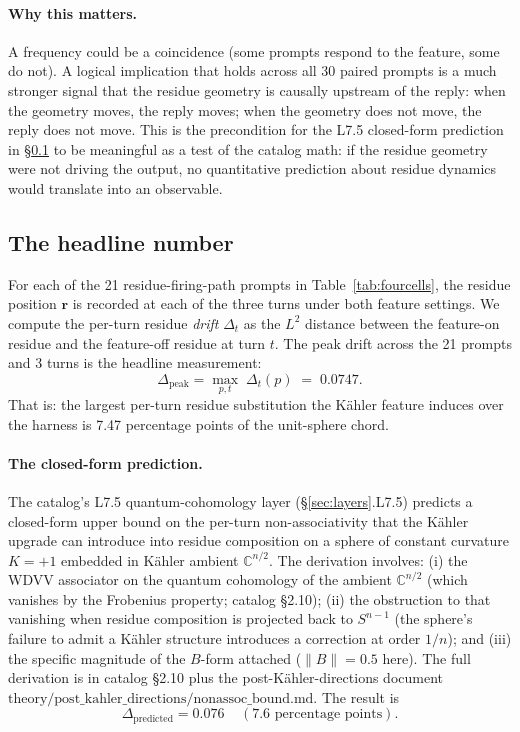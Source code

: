 \documentclass[11pt,letterpaper]{article}
\begin{document}
\paragraph{Why this matters.}
A frequency could be a coincidence (some prompts respond to the
feature, some do not). A logical implication that holds across all
30 paired prompts is a much stronger signal that the residue
geometry is causally upstream of the reply: when the geometry
moves, the reply moves; when the geometry does not move, the reply
does not move. This is the precondition for the L7.5 closed-form
prediction in \S\ref{sec:headlinenum} to be meaningful as a test of
the catalog math: if the residue geometry were not driving the
output, no quantitative prediction about residue dynamics would
translate into an observable.

\subsection{The headline number}
\label{sec:headlinenum}

For each of the 21 residue-firing-path prompts in
Table~\ref{tab:fourcells}, the residue position $\mathbf{r}$ is
recorded at each of the three turns under both feature settings.
We compute the per-turn residue \emph{drift} $\Delta_t$ as the
$L^2$ distance between the feature-on residue and the feature-off
residue at turn $t$. The peak drift across the 21 prompts and 3
turns is the headline measurement:
\[
\Delta_{\text{peak}} = \max_{p, t} \; \Delta_t(p) \; = \; 0.0747.
\]
That is: the largest per-turn residue substitution the K\"ahler
feature induces over the harness is 7.47 percentage points of the
unit-sphere chord.

\paragraph{The closed-form prediction.}
The catalog's L7.5 quantum-cohomology layer
(\S\ref{sec:layers}.L7.5) predicts a closed-form upper bound on the
per-turn non-associativity that the K\"ahler upgrade can introduce
into residue composition on a sphere of constant curvature $K = +1$
embedded in K\"ahler ambient $\mathbb{C}^{n/2}$. The derivation
involves: (i) the WDVV associator on the quantum cohomology of the
ambient $\mathbb{C}^{n/2}$ (which vanishes by the Frobenius
property; catalog \S2.10); (ii) the obstruction to that vanishing
when residue composition is projected back to $S^{n-1}$
(the sphere's failure to admit a K\"ahler structure introduces a
correction at order $1/n$); and (iii) the specific magnitude of
the $B$-form attached ($\|B\| = 0.5$ here). The full derivation is
in catalog \S2.10 plus the post-K\"ahler-directions document
$\text{theory/post\_kahler\_directions/nonassoc\_bound.md}$. The
result is
\[
\Delta_{\text{predicted}} = 0.076 \;\;\;\; (\text{7.6 percentage
points}).
\]
\end{document}
